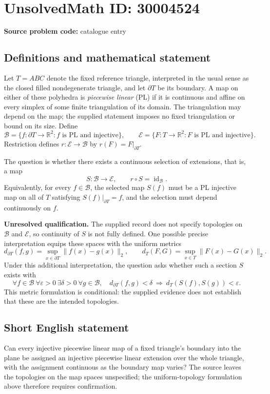 \documentclass[11pt]{article}
\newcommand{\R}{\mathbb{R}}
\begin{document}
\section*{UnsolvedMath ID: 30004524}
\textbf{Source problem code:} catalogue entry
\subsection{Definitions and mathematical statement}
Let \(T=ABC\) denote the fixed reference triangle, interpreted in the usual sense as the closed filled nondegenerate triangle, and let \(\partial T\) be its boundary. A map on either of these polyhedra is \emph{piecewise linear} (PL) if it is continuous and affine on every simplex of some finite triangulation of its domain. The triangulation may depend on the map; the supplied statement imposes no fixed triangulation or bound on its size. Define
\[
\mathcal B=\{f:\partial T\to\R^2: f\text{ is PL and injective}\},\qquad
\mathcal E=\{F:T\to\R^2: F\text{ is PL and injective}\}.
\]
Restriction defines \(r:\mathcal E\to\mathcal B\) by \(r(F)=F|_{\partial T}\).

The question is whether there exists a continuous selection of extensions, that is, a map
\[
S:\mathcal B\longrightarrow\mathcal E,
\qquad r\circ S=\operatorname{id}_{\mathcal B}.
\]
Equivalently, for every \(f\in\mathcal B\), the selected map \(S(f)\) must be a PL injective map on all of \(T\) satisfying \(S(f)|_{\partial T}=f\), and the selection must depend continuously on \(f\).

\textbf{Unresolved qualification.} The supplied record does not specify topologies on \(\mathcal B\) and \(\mathcal E\), so continuity of \(S\) is not fully defined. One possible precise interpretation equips these spaces with the uniform metrics
\[
d_{\partial T}(f,g)=\sup_{x\in\partial T}\|f(x)-g(x)\|_2,
\qquad
d_T(F,G)=\sup_{x\in T}\|F(x)-G(x)\|_2.
\]
Under this additional interpretation, the question asks whether such a section \(S\) exists with
\[
\forall f\in\mathcal B\ \forall\varepsilon>0\ \exists\delta>0\ \forall g\in\mathcal B,
\quad d_{\partial T}(f,g)<\delta
\ \Longrightarrow\ d_T(S(f),S(g))<\varepsilon.
\]
This metric formulation is conditional: the supplied evidence does not establish that these are the intended topologies.
\subsection{Short English statement}
Can every injective piecewise linear map of a fixed triangle's boundary into the plane be assigned an injective piecewise linear extension over the whole triangle, with the assignment continuous as the boundary map varies? The source leaves the topologies on the map spaces unspecified; the uniform-topology formulation above therefore requires confirmation.
\end{document}
